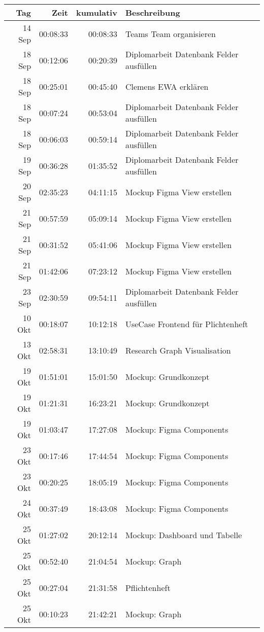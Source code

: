 \begin{longtable}{r | r | r | p{}}
     Tag & Zeit & kumulativ & Beschreibung \\
     \hline

	 14 Sep & 00:08:33 & 00:08:33 & Teams Team organisieren \\ 
	 18 Sep & 00:12:06 & 00:20:39 & Diplomarbeit Datenbank Felder ausfüllen \\ 
	 18 Sep & 00:25:01 & 00:45:40 & Clemens EWA erklären \\ 
	 18 Sep & 00:07:24 & 00:53:04 & Diplomarbeit Datenbank Felder ausfüllen \\ 
	 18 Sep & 00:06:03 & 00:59:14 & Diplomarbeit Datenbank Felder ausfüllen \\ 
	 19 Sep & 00:36:28 & 01:35:52 & Diplomarbeit Datenbank Felder ausfüllen \\ 
	 20 Sep & 02:35:23 & 04:11:15 & Mockup Figma View erstellen \\ 
	 21 Sep & 00:57:59 & 05:09:14 & Mockup Figma View erstellen \\ 
	 21 Sep & 00:31:52 & 05:41:06 & Mockup Figma View erstellen \\ 
	 21 Sep & 01:42:06 & 07:23:12 & Mockup Figma View erstellen \\ 
	 23 Sep & 02:30:59 & 09:54:11 & Diplomarbeit Datenbank Felder ausfüllen \\ 
	 10 Okt & 00:18:07 & 10:12:18 & UseCase Frontend für Plichtenheft \\ 
	 13 Okt & 02:58:31 & 13:10:49 & Research Graph Visualisation \\ 
	 19 Okt & 01:51:01 & 15:01:50 & Mockup: Grundkonzept \\ 
	 19 Okt & 01:21:31 & 16:23:21 & Mockup: Grundkonzept \\ 
	 19 Okt & 01:03:47 & 17:27:08 & Mockup: Figma Components \\ 
	 23 Okt & 00:17:46 & 17:44:54 & Mockup: Figma Components \\ 
	 23 Okt & 00:20:25 & 18:05:19 & Mockup: Figma Components \\ 
	 24 Okt & 00:37:49 & 18:43:08 & Mockup: Figma Components \\ 
	 25 Okt & 01:27:02 & 20:12:14 & Mockup: Dashboard und Tabelle \\ 
	 25 Okt & 00:52:40 & 21:04:54 & Mockup: Graph \\ 
	 25 Okt & 00:27:04 & 21:31:58 & Pflichtenheft \\ 
	 25 Okt & 00:10:23 & 21:42:21 & Mockup: Graph \\ 

\end{longtable}
